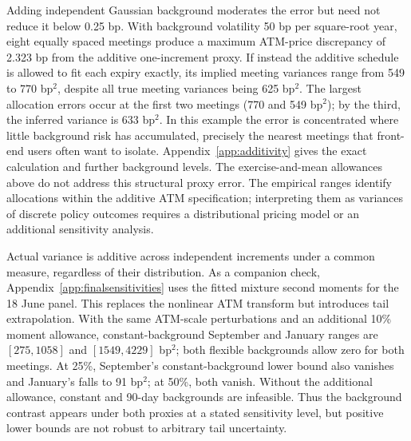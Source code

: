 Adding independent Gaussian background moderates the error but need not reduce it below 0.25 bp. With background volatility 50 bp per square-root year, eight equally spaced meetings produce a maximum ATM-price discrepancy of 2.323 bp from the additive one-increment proxy. If instead the additive schedule is allowed to fit each expiry exactly, its implied meeting variances range from 549 to 770 bp$^2$, despite all true meeting variances being 625 bp$^2$. The largest allocation errors occur at the first two meetings (770 and 549 bp$^2$); by the third, the inferred variance is 633 bp$^2$. In this example the error is concentrated where little background risk has accumulated, precisely the nearest meetings that front-end users often want to isolate. Appendix~\ref{app:additivity} gives the exact calculation and further background levels. The exercise-and-mean allowances above do not address this structural proxy error. The empirical ranges identify allocations within the additive ATM specification; interpreting them as variances of discrete policy outcomes requires a distributional pricing model or an additional sensitivity analysis.

Actual variance is additive across independent increments under a common measure, regardless of their distribution. As a companion check, Appendix~\ref{app:finalsensitivities} uses the fitted mixture second moments for the 18 June panel. This replaces the nonlinear ATM transform but introduces tail extrapolation. With the same ATM-scale perturbations and an additional 10\% moment allowance, constant-background September and January ranges are $[275,1058]$ and $[1549,4229]$ bp$^2$; both flexible backgrounds allow zero for both meetings. At 25\%, September's constant-background lower bound also vanishes and January's falls to 91 bp$^2$; at 50\%, both vanish. Without the additional allowance, constant and 90-day backgrounds are infeasible. Thus the background contrast appears under both proxies at a stated sensitivity level, but positive lower bounds are not robust to arbitrary tail uncertainty.
